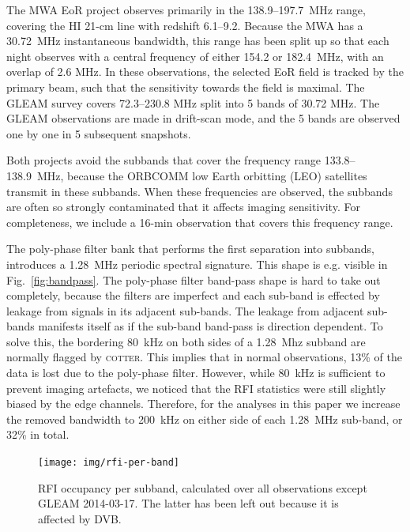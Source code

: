\documentclass{pasa}
\begin{document}
The MWA EoR project observes primarily in the 138.9--197.7~MHz range, covering the HI 21-cm line with redshift 6.1--9.2. Because the MWA has a 30.72~MHz instantaneous bandwidth, this range has been split up so that each night observes with a central frequency of either 154.2 or 182.4~MHz, with an overlap of 2.6 MHz. In these observations, the selected EoR field is tracked by the primary beam, such that the sensitivity towards the field is maximal. The GLEAM survey covers 72.3--230.8 MHz split into 5 bands of 30.72 MHz. The GLEAM observations are made in drift-scan mode, and the 5 bands are observed one by one in 5 subsequent snapshots.

Both projects avoid the subbands that cover the frequency range 133.8--138.9~MHz, because the ORBCOMM low Earth orbitting (LEO) satellites transmit in these subbands. When these frequencies are observed, the subbands are often so strongly contaminated that it affects imaging sensitivity. For completeness, we include a 16-min observation that covers this frequency range.

The poly-phase filter bank that performs the first separation into subbands, introduces a 1.28~MHz periodic spectral signature. This shape is e.g. visible in Fig.~\ref{fig:bandpass}. The poly-phase filter band-pass shape is hard to take out completely, because the filters are imperfect and each sub-band is effected by leakage from signals in its adjacent sub-bands. The leakage from adjacent sub-bands manifests itself as if the sub-band band-pass is direction dependent. To solve this, the bordering 80~kHz on both sides of a 1.28~Mhz subband are normally flagged by \textsc{cotter}. This implies that in normal observations, 13\% of the data is lost due to the poly-phase filter. However, while 80~kHz is sufficient to prevent imaging artefacts, we noticed that the RFI statistics were still slightly biased by the edge channels. Therefore, for the analyses in this paper we increase the removed bandwidth to 200~kHz on either side of each 1.28~MHz sub-band, or 32\% in total.

\noindent\begin{figure}
\begin{center}\hspace*{-0.2cm}\texttt{[image: img/rfi-per-band]}
\caption{RFI occupancy per subband, calculated over all observations except GLEAM 2014-03-17. The latter has been left out because it is affected by DVB.}
\label{fig:rfi-per-band}
\end{center}
\end{figure}
\end{document}
